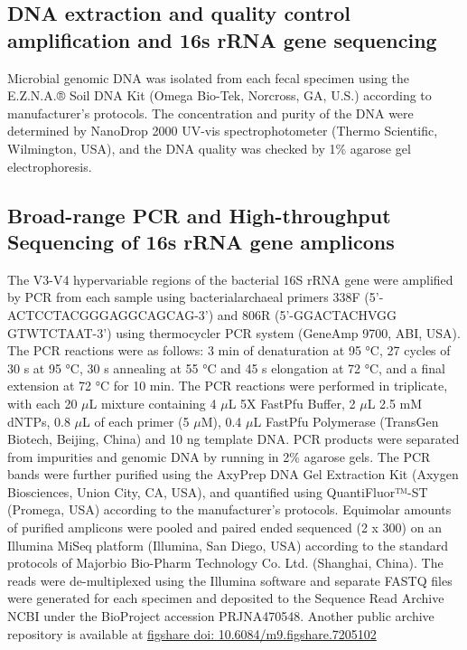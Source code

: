 \documentclass[fleqn,10pt, lineno]{wlpeerj} %
\begin{document}
  \subsection*{DNA extraction and quality control amplification and 16s rRNA gene sequencing}
  Microbial genomic DNA was isolated from each fecal specimen using the E.Z.N.A.® Soil DNA Kit (Omega Bio-Tek, Norcross, GA, U.S.) according to manufacturer’s protocols. The concentration and purity of the DNA were determined by NanoDrop 2000 UV-vis spectrophotometer (Thermo Scientific, Wilmington, USA), and the DNA quality was checked by 1\% agarose gel electrophoresis.

  \subsection*{Broad-range PCR and High-throughput Sequencing of 16s rRNA gene amplicons}
  The V3-V4 hypervariable regions of the bacterial 16S rRNA gene were amplified by PCR from each sample using bacterial\/archaeal primers 338F (5’-ACTCCTACGGGAGGCAGCAG-3’) and 806R (5’-GGACTACHVGG GTWTCTAAT-3’) using thermocycler PCR system (GeneAmp 9700, ABI, USA). The PCR reactions were as follows: 3 min of denaturation at 95 °C, 27 cycles of 30 s at 95 °C, 30 s annealing at 55 °C and 45 s elongation at 72 °C, and a final extension at 72 °C for 10 min. The PCR reactions were performed in triplicate, with each 20 $\mu$L mixture containing 4 $\mu$L 5X FastPfu Buffer, 2 $\mu$L 2.5 mM dNTPs, 0.8 $\mu$L of each primer (5 $\mu$M), 0.4 $\mu$L FastPfu Polymerase (TransGen Biotech, Beijing, China) and 10 ng template DNA.  PCR products were separated from impurities and genomic DNA by running in 2\% agarose gels.  The PCR bands were further purified using the AxyPrep DNA Gel Extraction Kit (Axygen Biosciences, Union City, CA, USA), and quantified using QuantiFluor™-ST (Promega, USA) according to the manufacturer’s protocols.
  Equimolar amounts of purified amplicons were pooled and paired ended sequenced (2 x 300) on an Illumina MiSeq platform (Illumina, San Diego, USA) according to the standard protocols of Majorbio Bio-Pharm Technology Co. Ltd. (Shanghai, China). The reads were de-multiplexed using the Illumina software and separate FASTQ files were generated for each specimen and deposited to the Sequence Read Archive NCBI under the BioProject accession PRJNA470548. Another public archive repository is available at \href{https://figshare.com/articles/Untitled_Item192_samples_for_publishing_Longitudinal_gut_microbiota_patterns_in_preterm_infants_with_necrotizing_enterocolitis_or_late-onset_sepsis_an_observational_prospective_study_/7205102}{figshare doi: 10.6084/m9.figshare.7205102}
\end{document}

